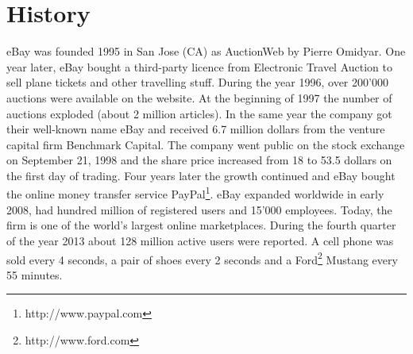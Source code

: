 \section{History}
eBay was founded 1995 in San Jose (CA) as AuctionWeb by Pierre Omidyar. One year later, eBay bought a third-party licence from Electronic Travel Auction to sell plane tickets and other travelling stuff. During the year 1996, over 200'000 auctions were available on the website. At the beginning of 1997 the number of auctions exploded (about 2 million articles). In the same year the company got their well-known name eBay and received 6.7 million dollars from the venture capital firm Benchmark Capital. The company went public on the stock exchange on September 21, 1998 and the share price increased from 18 to 53.5 dollars on the first day of trading. Four years later the growth continued and eBay bought the online money transfer service PayPal\footnote{http://www.paypal.com}. eBay expanded worldwide in early 2008, had hundred million of registered users and 15'000 employees. Today, the firm is one of the world's largest online marketplaces. During the fourth quarter of the year 2013 about 128 million active users were reported. A cell phone was sold every 4 seconds, a pair of shoes every 2 seconds and a Ford\footnote{http://www.ford.com} Mustang every 55 minutes.

